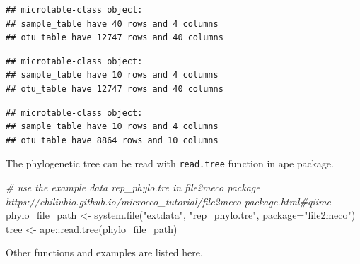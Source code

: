 \documentclass[
]{book}
\newenvironment{Shaded}{\begin{snugshade}}{\end{snugshade}}
\newcommand{\AttributeTok}[1]{\textcolor[rgb]{0.77,0.63,0.00}{#1}}
\newcommand{\CommentTok}[1]{\textcolor[rgb]{0.56,0.35,0.01}{\textit{#1}}}
\newcommand{\DecValTok}[1]{\textcolor[rgb]{0.00,0.00,0.81}{#1}}
\newcommand{\FunctionTok}[1]{\textcolor[rgb]{0.00,0.00,0.00}{#1}}
\newcommand{\NormalTok}[1]{#1}
\newcommand{\OtherTok}[1]{\textcolor[rgb]{0.56,0.35,0.01}{#1}}
\newcommand{\SpecialCharTok}[1]{\textcolor[rgb]{0.00,0.00,0.00}{#1}}
\newcommand{\StringTok}[1]{\textcolor[rgb]{0.31,0.60,0.02}{#1}}
\begin{document}
\begin{verbatim}
## microtable-class object:
## sample_table have 40 rows and 4 columns
## otu_table have 12747 rows and 40 columns
\end{verbatim}

\begin{Shaded}
\end{Shaded}

\begin{verbatim}
## microtable-class object:
## sample_table have 10 rows and 4 columns
## otu_table have 12747 rows and 40 columns
\end{verbatim}

\begin{Shaded}
\end{Shaded}

\begin{verbatim}
## microtable-class object:
## sample_table have 10 rows and 4 columns
## otu_table have 8864 rows and 10 columns
\end{verbatim}

The phylogenetic tree can be read with \texttt{read.tree} function in ape package.

\begin{Shaded}
\begin{Highlighting}[]
\CommentTok{\# use the example data rep\_phylo.tre in file2meco package https://chiliubio.github.io/microeco\_tutorial/file2meco{-}package.html\#qiime}
\NormalTok{phylo\_file\_path }\OtherTok{\textless{}{-}} \FunctionTok{system.file}\NormalTok{(}\StringTok{"extdata"}\NormalTok{, }\StringTok{"rep\_phylo.tre"}\NormalTok{, }\AttributeTok{package=}\StringTok{"file2meco"}\NormalTok{)}
\NormalTok{tree }\OtherTok{\textless{}{-}}\NormalTok{ ape}\SpecialCharTok{::}\FunctionTok{read.tree}\NormalTok{(phylo\_file\_path)}
\end{Highlighting}
\end{Shaded}

Other functions and examples are listed here.
\end{document}
